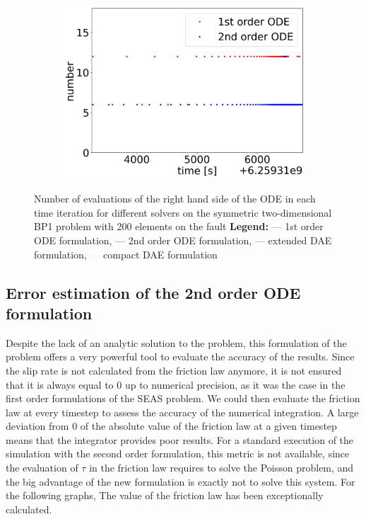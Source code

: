 \begin{figure}[H]
\begin{subfigure}{0.32\textwidth}
    	\includegraphics[width=1\textwidth]{images/TANDEMcompareFormulationstimeEvolutionRHSearthquake.png}
    \end{subfigure}
    \caption{Number of evaluations of the right hand side of the ODE in each time iteration for different solvers on the symmetric two-dimensional BP1 problem with 200 elements on the fault \newline
    \textbf{Legend:} \textcolor{red}{---} 1st order ODE formulation, \textcolor{blue}{---} 2nd order ODE formulation, \textcolor{green}{---} extended DAE formulation, \textcolor{yellow}{---} compact DAE formulation }
    \label{fig:timeEvolutionTANDEM_RHS}
\end{figure}

\subsection{Error estimation of the 2nd order ODE formulation}
Despite the lack of an analytic solution to the problem, this formulation of the problem offers a very powerful tool to evaluate the accuracy of the results. Since the slip rate is not calculated from the friction law anymore, it is not ensured that it is always equal to 0 up to numerical precision, as it was the case in the first order formulations of the SEAS problem. We could then evaluate the friction law at every timestep to assess the accuracy of the numerical integration. A large deviation from 0 of the absolute value of the friction law at a given timestep means that the integrator provides poor results. For a standard execution of the simulation with the second order formulation, this metric is not available, since the evaluation of $\tau$ in the friction law requires to solve the Poisson problem, and the big advantage of the new formulation is exactly not to solve this system. For the following graphs, The value of the friction law has been exceptionally calculated. \\

